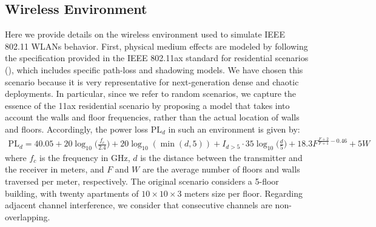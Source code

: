 \documentclass{article}
\begin{document}
\begin{appendices}
\section{Wireless Environment}
\label{section:simulated_wireless_environment}	
Here we provide details on the wireless environment used to simulate IEEE 802.11 WLANs behavior. First, physical medium effects are modeled by following the specification provided in the IEEE 802.11ax standard for residential scenarios (\citealp{merlin2015tgax}), which includes specific path-loss and shadowing models. We have chosen this scenario because it is very representative for next-generation dense and chaotic deployments. In particular, since we refer to random scenarios, we capture the essence of the 11ax residential scenario by proposing a model that takes into account the walls and floor frequencies, rather than the actual location of walls and floors. Accordingly, the power loss $\text{PL}_d$ in such an environment is given by:
\begin{align}
	\text{PL}_d = 40.05 + 20 \log_{10}\Big(\frac{f_c}{2.4}\Big) + 20 \log_{10}(\min(d,5)) + \nonumber I_{d>5} \cdot 35\log_{10}\Big(\frac{d}{5}\Big) + 18.3 F^{\frac{F+2}{F+1}-0.46} + 5W
	\nonumber
\end{align}	
where $f_c$ is the frequency in GHz, $d$ is the distance between the transmitter and the receiver in meters, and $F$ and $W$ are the average number of floors and walls traversed per meter, respectively. The original scenario considers a 5-floor building, with twenty apartments of $10\times10\times3$ meters size per floor. Regarding adjacent channel interference, we consider that consecutive channels are non-overlapping. 


\end{appendices}
\end{document}
